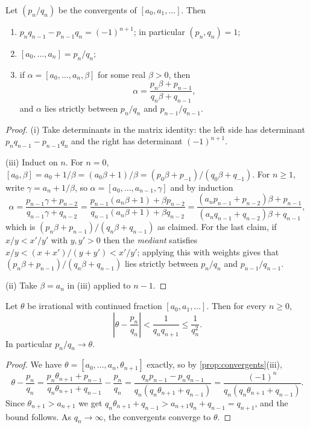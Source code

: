 \begin{proposition}\label{prop:convergents}
	Let $(p_n/q_n)$ be the convergents of $[a_0, a_1, \dots]$. Then
	\begin{enumerate}[label=(\roman*)]
		\item $p_nq_{n-1} - p_{n-1}q_n = (-1)^{n+1}$; in particular $(p_n, q_n) = 1$;
		\item $[a_0, \dots, a_n] = p_n/q_n$;
		\item if $\alpha = [a_0, \dots, a_n, \beta]$ for some real $\beta > 0$, then
		$$
		\alpha = \frac{p_n\beta + p_{n-1}}{q_n\beta + q_{n-1}},
		$$
		and $\alpha$ lies strictly between $p_n/q_n$ and $p_{n-1}/q_{n-1}$.
	\end{enumerate}
\end{proposition}
\begin{proof}
	(i) Take determinants in the matrix identity: the left side has determinant $p_nq_{n-1} - p_{n-1}q_n$ and the right has determinant $(-1)^{n+1}$.

	(iii) Induct on $n$. For $n = 0$, $[a_0, \beta] = a_0 + 1/\beta = (a_0\beta + 1)/\beta = (p_0\beta + p_{-1})/(q_0\beta + q_{-1})$. For $n \geq 1$, write $\gamma = a_n + 1/\beta$, so $\alpha = [a_0, \dots, a_{n-1}, \gamma]$ and by induction
	$$
	\alpha = \frac{p_{n-1}\gamma + p_{n-2}}{q_{n-1}\gamma+q_{n-2}} = \frac{p_{n-1}(a_n\beta + 1) + \beta p_{n-2}}{q_{n-1}(a_n\beta+1)+\beta q_{n-2}} = \frac{(a_np_{n-1} + p_{n-2})\beta + p_{n-1}}{(a_nq_{n-1}+q_{n-2})\beta+q_{n-1}},
	$$
	which is $(p_n\beta + p_{n-1})/(q_n\beta+q_{n-1})$ as claimed.
	For the last claim, if $x/y < x'/y'$ with $y, y' > 0$ then the \emph{mediant} satisfies $x/y < (x + x')/(y+y') < x'/y'$; applying this with weights gives that $(p_n\beta + p_{n-1})/(q_n\beta+q_{n-1})$ lies strictly between $p_n/q_n$ and $p_{n-1}/q_{n-1}$.

	(ii) Take $\beta = a_n$ in (iii) applied to $n - 1$.
\end{proof}

\begin{theorem}\label{thm:cfconverge}
	Let $\theta$ be irrational with continued fraction $[a_0, a_1, \dots]$. Then for every $n \geq 0$,
	$$
	\left|\theta - \frac{p_n}{q_n}\right| < \frac1{q_nq_{n+1}} \leq \frac{1}{q_n^2}.
	$$
	In particular $p_n/q_n \to \theta$.
\end{theorem}
\begin{proof}
	We have $\theta = [a_0, \dots, a_n, \theta_{n+1}]$ exactly, so by \autoref{prop:convergents}(iii),
	$$
	\theta - \frac{p_n}{q_n} = \frac{p_n\theta_{n+1}+p_{n-1}}{q_n\theta_{n+1}+q_{n-1}} - \frac{p_n}{q_n} = \frac{q_np_{n-1} - p_nq_{n-1}}{q_n(q_n\theta_{n+1}+q_{n-1})} = \frac{(-1)^{n}}{q_n(q_n\theta_{n+1}+q_{n-1})}.
	$$
	Since $\theta_{n+1} > a_{n+1}$ we get $q_n\theta_{n+1}+q_{n-1} > a_{n+1}q_n + q_{n-1} = q_{n+1}$, and the bound follows. As $q_n \to \infty$, the convergents converge to $\theta$.
\end{proof}

